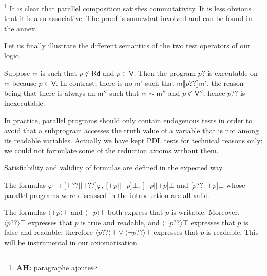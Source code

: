 \documentclass{llncs}
\newcommand{\modl}{\mathsf m}
\newcommand{\pll}{ {||} }							%
\newcommand{\readset}{\mathsf{Rd}}
\newcommand{\valuset}{\mathsf{V}}
\newcommand{\testendo}{?\!\!?}			%
\newcommand{\testpdl}{?}				%
\newcommand{\ah}[1]{\footnote{\textbf{AH:} #1}}
\newcommand{\assgntopV}[1]{{\mathtt {+} #1}}
\newcommand{\assgnbotV}[1]{{\mathtt {-} #1}}
\newcommand{\intPgm}[1]{\llbracket #1 \rrbracket}
\newcommand{\lbox}[1]{ \big[ #1 \big] }
\newcommand{\ldia}[1]{ \big\langle #1 \big\rangle}
\newcommand{\limp}{ \rightarrow }
\newcommand{\ndet}{\,{\cup}\,}
\renewcommand{\phi}{\varphi}
\begin{document}
\ah{
paragraphe ajoute
}
It is clear that parallel composition satisfies commutativity. 
It is less obvious that it is also associative. 
The proof is somewhat involved and can be found in the annex. 

Let us finally illustrate the different semantics of the two test operators of our logic.

\begin{example}
Suppose $\modl$ is such that $p \notin \readset$ and $p \in \valuset$. 
Then the program $p \testpdl$ is executable on $\modl$ because $p \in \valuset$.
In contrast, there is no $\modl'$ such that $\modl \intPgm{ p \testendo } \modl'$, 
the reason being that there is always an $\modl''$ such that $\modl \sim \modl''$ and $p \notin \valuset''$,
hence $p \testendo$ is inexecutable. %
\end{example}

In practice, parallel programs should only contain endogenous tests in order to avoid that a subprogram accesses the truth value of a variable that is not among its readable variables.
Actually we have kept PDL tests for technical reasons only:
we could not formulate some of the reduction axioms without them. 

Satisfiability and validity of formulas are defined in the expected way.

\begin{example}
The formulas 
$\phi \limp \lbox{ \top \testendo \pll \top \testendo } \phi$, 
$\lbox{ \assgntopV p \pll \assgnbotV p } \bot$,
$\lbox{ \assgntopV p \pll \assgntopV p } \bot$ and 
$\lbox{ p \testendo \pll \assgntopV p } \bot$ 
whose parallel programs were discussed in the introduction are all valid. 
\end{example}

The formulas $\ldia{ \assgntopV p } \top $ and $\ldia{ \assgnbotV p } \top $ both express that $p$ is writable. 
Moreover, $\ldia{ p \testendo} \top $ expresses that $p$ is true and readable, and 
$\ldia{ \lnot p \testendo} \top $ expresses that $p$ is false and readable;
therefore $\ldia{ p \testendo} \top \lor \ldia{ \lnot p \testendo} \top $ 
expresses that $p$ is readable. 
This will be instrumental in our axiomatisation. 
\end{document}

